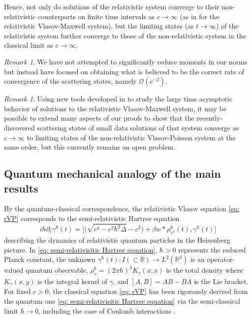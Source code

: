 \documentclass[reqno, 11pt, letterpaper]{amsart}
\theoremstyle{remark}
\newtheorem{remark}[theorem]{Remark}
\numberwithin{equation}{section}
\numberwithin{theorem}{section}
\numberwithin{table}{section}
\numberwithin{figure}{section}
\begin{document}
Hence, not only do solutions of the relativistic system converge to their non-relativistic counterparts on finite time intervals as $c \to \infty$ (as in \cite{Degond, Schaeffer} for the relativistic Vlasov-Maxwell system), but the limiting states (as $t\to \infty$) of the relativistic system further converge to those of the non-relativistic system in the classical limit as $c \to \infty$.

\begin{remark}
We have not attempted to significantly reduce moments in our norms but instead have focused on obtaining what is believed to be the correct rate of convergence of the scattering states, namely $\mathcal{O}(c^{-2})$.
\end{remark}
\begin{remark}
Using new tools developed in \cite{Bigorgne, Breton, PBA} to study the large time asymptotic behavior of solutions to the relativistic Vlasov-Maxwell system, it may be possible to extend many aspects of our proofs to show that the recently-discovered scattering states of small data solutions of that system converge as $c \to \infty$ to limiting states of the non-relativistic Vlasov-Poisson system at the same order, but this currently remains an open problem.
\end{remark}

\subsection{Quantum mechanical analogy of the main results}

By the quantum-classical correspondence, the relativistic Vlasov equation \eqref{eq: rVP} corresponds to the semi-relativistic Hartree equation
\begin{equation}\label{eq: semi-relativisitic Hartree equation}
i\hbar\partial_t \gamma^\hbar(t)=\Big[\Big(\sqrt{c^4-c^2\hbar^2\Delta}-c^2\Big)+\beta w*\rho^\hbar_{\gamma^\hbar}(t), \gamma^\hbar(t)\Big]
\end{equation}
describing the dynamics of relativistic quantum particles in the Heisenberg picture. In \eqref{eq: semi-relativisitic Hartree equation}, $\hbar>0$ represents the reduced Planck constant, the unknown $\gamma^\hbar(t): I(\subset\mathbb{R})\to L^2(\mathbb{R}^3)$ is an operator-valued quantum observable, $\rho_\gamma^\hbar=(2\pi\hbar)^3K_{\gamma}(x,x)$ is the total density where $K_\gamma(x,y)$ is the integral kernel of $\gamma$, and $[A,B]=AB-BA$ is the Lie bracket. For fixed $c>0$, the classical equation \eqref{eq: rVP} has been rigorously derived from the quantum one \eqref{eq: semi-relativisitic Hartree equation} via the semi-classical limit $\hbar\to0$, including the case of Coulomb interactions \cite{AkiMarkowichSparber08, DietlerRademacherSchlein18, LeoplodSaffirio23}.
\end{document}
